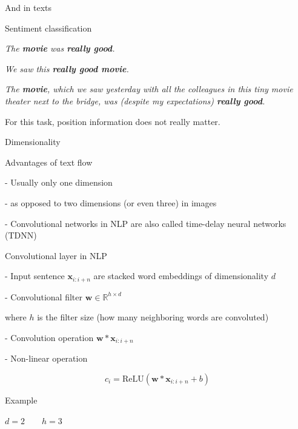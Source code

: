 \documentclass[12pt]{beamer}
\begin{document}
\begin{frame}{And in texts}

Sentiment classification

\emph{The \textbf{movie} was \textbf{really good}.}

\emph{We saw this \textbf{really good movie}.}

\emph{The \textbf{movie}, which we saw yesterday with all the colleagues in this tiny movie theater next to the bridge, was (despite my expectations) \textbf{really good}.}


For this task, position information does not really matter.
	
	
\end{frame}

\begin{frame}{Dimensionality}


Advantages of text flow

- Usually only one dimension

- as opposed to two dimensions (or even three) in images

-  Convolutional networks in NLP are also called time-delay neural networks (TDNN)

	
\end{frame}


\begin{frame}{Convolutional layer in NLP}
	
- Input sentence $\mathbf{x}_{i:i+n}$ are stacked word embeddings of dimensionality $d$

- Convolutional filter $\mathbf{w} \in \mathbb{R}^{h \times d}$

where $h$ is the filter size (how many neighboring words are convoluted)

- Convolution operation $\mathbf{w} * \mathbf{x}_{i:i+n}$

- Non-linear operation

$$
c_i = \mathrm{ReLU}(\mathbf{w} * \mathbf{x}_{i:i+n} + b)
$$

\end{frame}

\begin{frame}{Example}

$d = 2 \qquad h = 3$



\end{frame}
\end{document}
